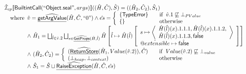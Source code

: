 \documentclass{article}
\makeatletter
\newcommand{\SF}[1]{\mbox{\textsf{#1}}}
\newcommand{\wherec}[1]{{\rm where}\begin{array}[t]{l}#1\end{array}}
\newcommand{\ifc}[1]{{\rm if}\begin{array}[t]{l}#1\end{array}}
\newcommand{\owc}{{\rm otherwise}}
\newcommand{\aI}{\hat{\mathcal{I}}}
\newcommand{\lbr}{\llbracket}
\newcommand{\rbr}{\rrbracket}
\newcommand{\ahf}[1]{\widehat{\underline{\sf #1}}}
\newcommand{\avarprop}[1]{\hat{@#1}}
\newcommand{\afalse}{\hat{\SF{false}}}
\makeatother
\begin{document}
\[
\begin{array}{ll}

\aI _{cp}\lbr \SF{BuiltintCall}(``\SF{Object.seal}",args)\rbr((\hat{H},\hat{C}), \hat{S})
  = ((\hat{H}_2, \hat{C}_2), \hat{S}_1)\\
\quad\wherec{
 \hat{v} =\ahf{getArgValue}(\hat{H}, \hat{C}, ``0")
  \land \hat{es} =
    \left\{
    \begin{array}{l@{\quad\quad}l}
      \{ \SF{TypeError} \} & \ifc{\hat{v}.1 \not\sqsubseteq \bot_{PValue}}\\
      \{ \}& \owc\\
    \end{array}
    \right.\\
  \land\ \hat{H}_1 = \bigsqcup_{\hat{l} \in \hat{v}.2}
    \bigsqcup_{s \in \ahf{GetProps}(\hat{H}, \hat{l})} \hat{H}
    \left[\hat{l} \mapsto \hat{H}(\hat{l})
      \left[\begin{array}{l}
        s \mapsto 
        \left\langle\begin{array}{l}
          \hat{H}(\hat{l})(x).1.1.1, \hat{H}(\hat{l})(x).1.1.2,\\
          \hat{H}(\hat{l})(x).1.1.3,\afalse 
        \end{array}\right\rangle\\
      \avarprop{extensible} \mapsto \afalse
      \end{array}\right]\right]\\
  \land\ (\hat{H}_2, \hat{C}_2) = 
    \left\{\begin{array}{l@{\quad\quad}l}
      (\ahf{ReturnStore}(\hat{H}_1, Value(\hat{v}.2)), \hat{C})
      & \ifc{Value(\hat{v}.2) \not\sqsubseteq \bot_{value}}\\
      (\bot_{heap}, \bot_{context}) & \owc \\
    \end{array}\right.\\
  \land\ \hat{S}_1 = \hat{S} \sqcup \ahf{RaiseException}(\hat{H}, \hat{C}, \hat{es})\\
  }\\
\\\\ 



\end{array}\]
\end{document}
